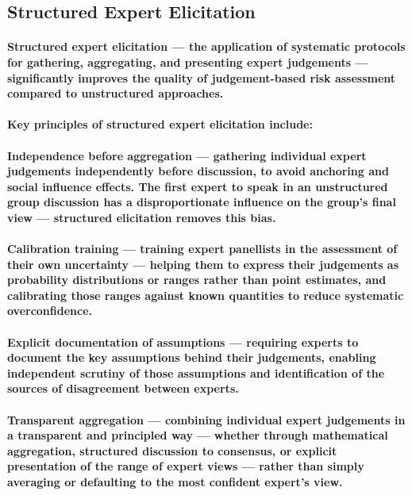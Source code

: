 \subsection{Structured Expert Elicitation}
\paragraph{\textbf{Structured expert elicitation} — the application of systematic protocols for gathering, aggregating, and presenting expert judgements — significantly improves the quality of judgement-based risk assessment compared to unstructured approaches.}
\paragraph{Key principles of structured expert elicitation include:}
\paragraph{\textbf{Independence before aggregation} — gathering individual expert judgements independently before discussion, to avoid anchoring and social influence effects. The first expert to speak in an unstructured group discussion has a disproportionate influence on the group's final view — structured elicitation removes this bias.}
\paragraph{\textbf{Calibration training} — training expert panellists in the assessment of their own uncertainty — helping them to express their judgements as probability distributions or ranges rather than point estimates, and calibrating those ranges against known quantities to reduce systematic overconfidence.}
\paragraph{\textbf{Explicit documentation of assumptions} — requiring experts to document the key assumptions behind their judgements, enabling independent scrutiny of those assumptions and identification of the sources of disagreement between experts.}
\paragraph{\textbf{Transparent aggregation} — combining individual expert judgements in a transparent and principled way — whether through mathematical aggregation, structured discussion to consensus, or explicit presentation of the range of expert views — rather than simply averaging or defaulting to the most confident expert's view.}

